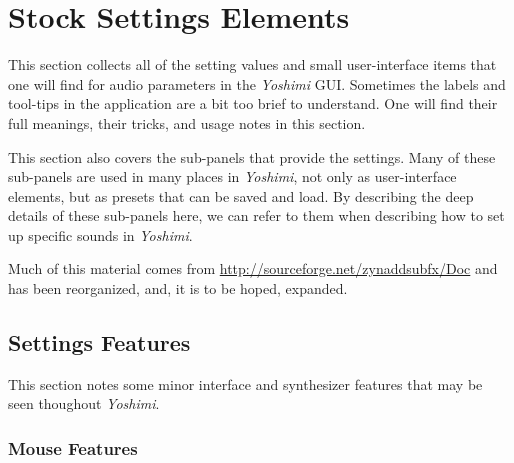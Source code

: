 %
%
%

\section{Stock Settings Elements}
\label{sec:stock_settings_elements}

   This section collects all of the setting values and small user-interface
   items that one will find for
   audio parameters in the \textsl{Yoshimi} GUI.
   Sometimes the labels and tool-tips
   in the application are a bit too brief to understand. 
   One will find their full meanings, their tricks, and usage notes
   in this section.

   This section also covers the sub-panels that provide the settings.
   Many of these sub-panels are used in many places in \textsl{Yoshimi},
   not only as user-interface elements, but as presets that can be saved and
   load.
   By describing the deep details of these sub-panels
   here, we can refer to them when
   describing how to set up specific sounds in
   \textsl{Yoshimi}.

   Much of this material comes from
   \url{http://sourceforge.net/zynaddsubfx/Doc}
   and has been reorganized, and, it is to be hoped, expanded.

\subsection{Settings Features}
\label{subsec:stock_settings_ui_features}

   This section notes some minor interface and synthesizer features that may
   be seen thoughout \textsl{Yoshimi}.

\subsubsection{Mouse Features}
\label{subsubsec:stock_settings_mouse_features}

